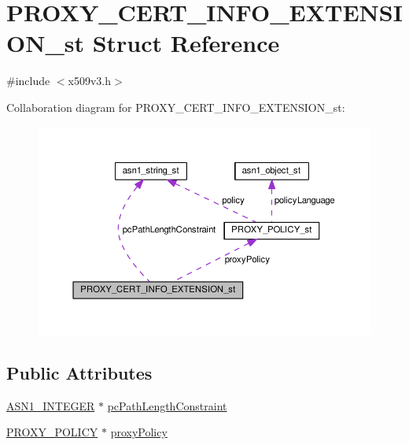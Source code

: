 \hypertarget{struct_p_r_o_x_y___c_e_r_t___i_n_f_o___e_x_t_e_n_s_i_o_n__st}{}\section{P\+R\+O\+X\+Y\+\_\+\+C\+E\+R\+T\+\_\+\+I\+N\+F\+O\+\_\+\+E\+X\+T\+E\+N\+S\+I\+O\+N\+\_\+st Struct Reference}
\label{struct_p_r_o_x_y___c_e_r_t___i_n_f_o___e_x_t_e_n_s_i_o_n__st}


{\ttfamily \#include $<$x509v3.\+h$>$}



Collaboration diagram for P\+R\+O\+X\+Y\+\_\+\+C\+E\+R\+T\+\_\+\+I\+N\+F\+O\+\_\+\+E\+X\+T\+E\+N\+S\+I\+O\+N\+\_\+st\+:
\nopagebreak
\begin{figure}[H]
\begin{center}
\leavevmode
\includegraphics[width=350pt]{struct_p_r_o_x_y___c_e_r_t___i_n_f_o___e_x_t_e_n_s_i_o_n__st__coll__graph}
\end{center}
\end{figure}
\subsection*{Public Attributes}
\begin{DoxyCompactItemize}
\item 
\hyperlink{ossl__typ_8h_af4335399bf9774cb410a5e93de65998b}{A\+S\+N1\+\_\+\+I\+N\+T\+E\+G\+ER} $\ast$ \hyperlink{struct_p_r_o_x_y___c_e_r_t___i_n_f_o___e_x_t_e_n_s_i_o_n__st_acf3159571e510bbbc386966004680934}{pc\+Path\+Length\+Constraint}
\item 
\hyperlink{x509v3_8h_afe0e9f86d459df9228819f55834a5cf0}{P\+R\+O\+X\+Y\+\_\+\+P\+O\+L\+I\+CY} $\ast$ \hyperlink{struct_p_r_o_x_y___c_e_r_t___i_n_f_o___e_x_t_e_n_s_i_o_n__st_a9e30dc35988c9cdca48712ac175ddbdb}{proxy\+Policy}
\end{DoxyCompactItemize}


